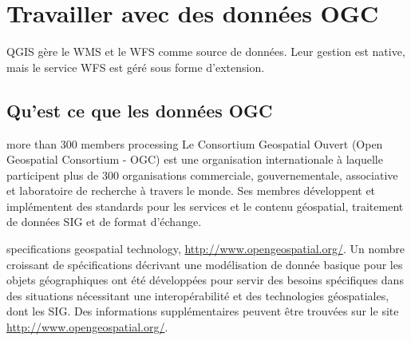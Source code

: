 \section{Travailler avec des données OGC}


QGIS gère le WMS et le WFS comme source de données. Leur gestion est native, mais
le service WFS  est géré sous forme d'extension.

\subsection{Qu'est ce que les données OGC}

more than 300 
members 
processing 
Le Consortium Geospatial Ouvert (Open Geospatial Consortium - OGC) est une
organisation internationale à laquelle participent plus de 300 organisations
commerciale, gouvernementale, associative et laboratoire de recherche à travers 
le monde. Ses membres développent et implémentent des standards pour les 
services et le contenu géospatial, traitement de données SIG et de format 
d'échange.

specifications 
geospatial technology, 
\url{http://www.opengeospatial.org/}.
Un nombre croissant de spécifications décrivant une modélisation de donnée
basique pour les objets géographiques ont été développées pour servir des besoins
spécifiques dans des situations nécessitant une interopérabilité et des technologies géospatiales,
dont les SIG. Des informations supplémentaires peuvent être trouvées sur le site
\url{http://www.opengeospatial.org/}.

